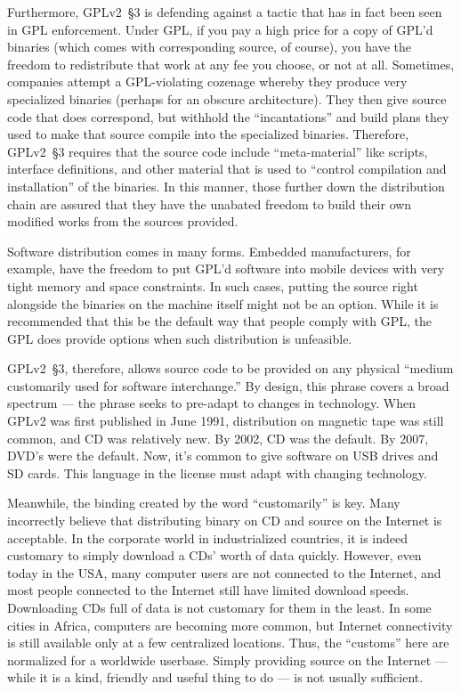 \label{GPLv2s3-build-scripts}

Furthermore, GPLv2~\S3 is defending against a tactic that has in fact been
seen in GPL enforcement.  Under GPL, if you pay a high price for
a copy of GPL'd binaries (which comes with corresponding source, of
course), you have the freedom to redistribute that work at any fee you
choose, or not at all.  Sometimes, companies attempt a GPL-violating
cozenage whereby they produce very specialized binaries (perhaps for
an obscure architecture).  They then give source code that does
correspond, but withhold the ``incantations'' and build plans they
used to make that source compile into the specialized binaries.
Therefore, GPLv2~\S3 requires that the source code include ``meta-material'' like
scripts, interface definitions, and other material that is used to
``control compilation and installation'' of the binaries.  In this
manner, those further down the distribution chain are assured that
they have the unabated freedom to build their own modified works
from the sources provided.

Software distribution comes in many
forms.  Embedded manufacturers, for example, have the freedom to put
GPL'd software into mobile devices with very tight memory and space
constraints.  In such cases, putting the source right alongside the
binaries on the machine itself might not be an option.  While it is
recommended that this be the default way that people comply with GPL, the
GPL does provide options when such distribution is unfeasible.

\label{GPLv2s3-medium-customarily}
GPLv2~\S3, therefore, allows source code to be provided on any physical
``medium customarily used for software interchange.''  By design, this
phrase covers a broad spectrum --- the phrase seeks to pre-adapt to
changes in  technology.  When GPLv2 was first published in June
1991, distribution on magnetic tape was still common, and CD was
relatively new.  By 2002, CD was the default.  By 2007, DVD's were the
default.  Now, it's common to give software on USB drives and SD cards.  This
language in the license must adapt with changing technology.

Meanwhile, the binding created by the word ``customarily'' is key.  Many
incorrectly believe that distributing binary on CD and source on the
Internet is acceptable.  In the corporate world in industrialized countries, it is indeed customary to
simply download a CDs' worth of data quickly.  However, even today in the USA, many computer users are not connected to the Internet, and most people connected
to the Internet still have limited download speeds.  Downloading
CDs full of data is not customary for them in the least.  In some cities
in Africa, computers are becoming more common, but Internet connectivity
is still available only at a few centralized locations.  Thus, the
``customs'' here are normalized for a worldwide userbase.  Simply
providing source on the Internet --- while it is a kind, friendly and
useful thing to do --- is not usually sufficient.

